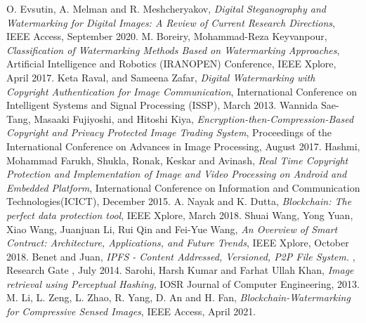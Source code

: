 \documentclass[10pt]{article}
\begin{document}
\begin{thebibliography}{9}

\bibitem{} O. Evsutin, A. Melman and R. Meshcheryakov, \emph{Digital Steganography and
Watermarking for Digital Images: A Review of Current Research Directions},
IEEE Access, September 2020.
\bibitem{} M. Boreiry, Mohammad-Reza Keyvanpour, \emph{Classification of Watermarking
Methods Based on Watermarking Approaches}, Artificial Intelligence and Robotics
(IRANOPEN) Conference, IEEE Xplore, April 2017.
\bibitem{}Keta Raval, and Sameena Zafar, \emph{Digital Watermarking with Copyright Authentication for Image Communication}, International Conference on Intelligent Systems and Signal Processing (ISSP), March 2013.
\bibitem{}Wannida Sae-Tang, Masaaki Fujiyoshi, and Hitoshi Kiya, 
\emph{Encryption-then-Compression-Based Copyright and Privacy Protected Image
Trading System}, Proceedings of the International Conference on Advances in
Image Processing, August 2017. 
\bibitem{}Hashmi, Mohammad Farukh, Shukla, Ronak, Keskar and Avinash,  \emph{Real Time Copyright Protection and Implementation of Image and Video Processing on Android and Embedded Platform}, International Conference on Information and Communication Technologies(ICICT), December 2015.
A. Nayak and K. Dutta, \emph{Blockchain: The perfect data protection tool}, IEEE Xplore, March 2018.
 Shuai Wang, Yong Yuan, Xiao Wang, Juanjuan Li, Rui Qin and Fei-Yue Wang, \emph{An
Overview of Smart Contract: Architecture, Applications, and Future Trends}, IEEE
Xplore, October 2018.
 Benet and Juan,  \emph{IPFS - Content Addressed, Versioned, P2P File System. }, Research Gate , July 2014.
 Sarohi, Harsh Kumar and Farhat Ullah Khan, \emph{Image retrieval using Perceptual
Hashing,} IOSR Journal of Computer Engineering, 2013.
 M. Li, L. Zeng, L. Zhao, R. Yang, D. An and H. Fan, \emph{Blockchain-Watermarking for
Compressive Sensed Images}, IEEE Access, April 2021.
\end{thebibliography}
\end{document}
